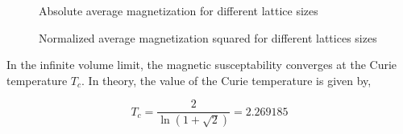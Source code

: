 \documentclass{article}
\begin{document}
\begin{figure}[H]
  \begin{center}
  \end{center}
  \caption{Absolute average magnetization for different lattice sizes}
  \label{fig:derivative}
\end{figure}

\begin{figure}[H]
  \begin{center}
  \end{center}
  \caption{Normalized average magnetization squared for different lattices sizes}
  \label{fig:derivative}
\end{figure}


In the infinite volume limit, the magnetic susceptability converges at the Curie temperature $T_{c}$. In theory, the value of
the Curie temperature is given by,

\begin{equation} \label{eq:curie_temp}
  T_{c} = \frac{2}{\ln(1 + \sqrt{2})} =  2.269185
\end{equation}
\end{document}
